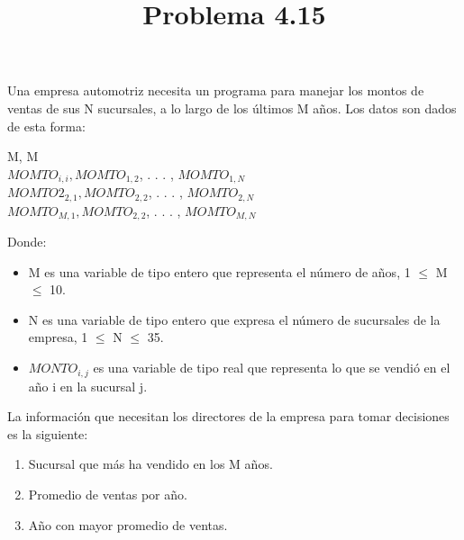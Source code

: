 \documentclass[11pt]{amsart}
\title{Problema 4.15}
\begin{document}
\maketitle
\noindent Una empresa automotriz necesita un programa para manejar los montos de ventas de sus N sucursales, a lo largo de los últimos M años. Los datos son dados de esta forma:

\begin{center}
M, M \\
$MOMTO_{i,i}, MOMTO_{1,2}$, . . .  , $MOMTO_{1,N}$ \\
$MOMTO2_{2,1}, MOMTO_{2,2}$, . . .  , $MOMTO_{2,N} $\\
$MOMTO_{M,1} , MOMTO_{2,2}$, . . .  , $MOMTO_{M,N}$\\
\end{center}

\noindent Donde:
\begin{itemize}
    \item M es una variable de tipo entero que representa el número de años, 1 $ \leq $ M $ \leq $ 10.
     \item N es una variable de tipo entero que expresa el número de sucursales de la empresa, 1 $ \leq $ N $ \leq $ 35.
    \item \(MONTO_{i, j}\) es una variable de tipo real que representa lo que se vendió en el año i en la sucursal j.\end{itemize}

\noindent La información que necesitan los directores de la empresa para tomar decisiones es la siguiente:

\begin{enumerate}
    \item[a)] Sucursal que más ha vendido en los M años.
    \item[b)] Promedio de ventas por año.
    \item[c)] Año con mayor promedio de ventas.
\end{enumerate}
\end{document}

